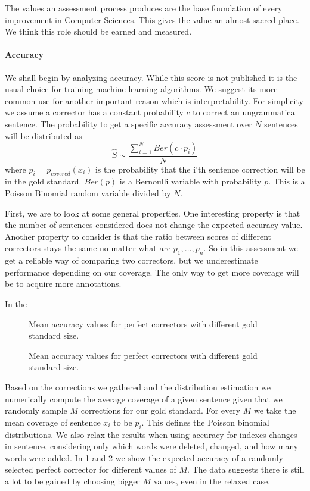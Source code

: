 \documentclass[english]{article}
\begin{document}
The values an assessment process produces are the base foundation of
 every improvement in Computer Sciences. This gives the value an
  almost sacred place. We think this role should be earned and measured.
 
 \paragraph{Accuracy}We shall begin by analyzing accuracy. While this score is not published it is the usual choice for training machine learning algorithms. We suggest its more common use for another important reason which is interpretability.
For simplicity we assume a corrector has a constant probability $c$ to correct an ungrammatical sentence. The probability to get a specific accuracy assessment over $N$ sentences will be distributed as $$\hat{S}\sim\frac{\sum_{i=1}^{N}Ber\left(c\cdot p_i\right)}{N} $$ 
where $p_i=p_{covered}\left(x_i\right) $ is the probability that the i'th sentence correction will be in the gold standard. 
$Ber\left(p\right)$ is a Bernoulli variable with probability $p$. This is a Poisson Binomial random variable divided by $N$. 

First, we are to look at some general properties.
 One interesting property is that the number of sentences considered does not change the expected accuracy value.
 Another property to consider is that the ratio between scores of different correctors stays the same no matter what are $p_1,\ldots,p_n$. So in this assessment we get a reliable way of comparing two correctors, but we underestimate performance depending on our coverage. The only way to get more coverage will be to acquire more annotations.
 
 In the
 
 \begin{figure}
 	\caption{Mean accuracy values for perfect correctors with different gold standard size.}
 	\label{fig:accuracy_vals}
 \end{figure}
  \begin{figure}
  	\caption{Mean accuracy values for perfect correctors with different gold standard size.}
  	\label{fig:accuracy_vals_ind}
  \end{figure}
 
 Based on the corrections we gathered and the distribution estimation we numerically compute the average coverage of a given sentence given that we randomly sample $M$ corrections for our gold standard. For every $M$ we take the mean coverage of sentence $x_i$ to be $p_i$. This defines the Poisson binomial distributions. We also relax the results when using accuracy for indexes changes in sentence, considering only which words were deleted, changed, and how many words were added. In \ref{fig:accuracy_vals} and \ref{fig:accuracy_vals_ind} we show the expected accuracy of a randomly selected perfect corrector for different values of $M$. The data suggests there is still a lot to be gained by choosing bigger $M$ values, even in the relaxed case.
 
\end{document}
